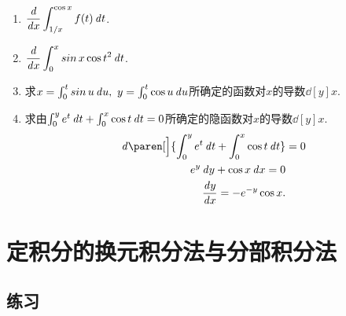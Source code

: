 \documentclass[a4paper,punct=CCT]{ctexbook}
\theoremstyle{definition}
\theoremstyle{remark}
\newif\ifshowsol
\newif\ifshowex
\begin{document}
\begin{enumerate}
\item \(\displaystyle \frac{\mathop{}\!\mathit{d}}{\mathop{}\!\mathit{d} x} \int_{1/x}^{\cos x} f(t) \mathop{}\!\mathit{d} t\).

  \ifshowsol
  \[
    \ddx \int_{1/x}^{\cos x} f(t) \dt
    = \ddx \paren[\Big]{\int_{1/x}^0 f(t) \dt + \int_0^{\cos x} f(t) \dt}
    = \frac{f(1/x)}{x^2} - f(\cos x) \sin x .
  \]
  \fi

\item \(\displaystyle \frac{\mathop{}\!\mathit{d}}{\mathop{}\!\mathit{d} x} \int_0^x \operatorname{\smash{sin}} x \cos t^2 \mathop{}\!\mathit{d} t\).

  \ifshowsol
  \[
    \ddx \int_0^x \sin x \cos t^2 \dt
    = \ddx \sin x \int_0^x \cos t^2 \dt
    = \cos x \int_0^x \cos t^2 \dt + \sin x \cos x^2.
  \]
  \fi

\item 求\(x = \int_0^t \operatorname{\smash{sin}} u \mathop{}\!\mathit{d} u,\ y = \int_0^t \cos u \mathop{}\!\mathit{d} u\)所确定的函数对\(x\)的导数\(\dd[y]x\).

  \ifshowsol
  \[
    \dd[y]x = \frac{\dy/\!\dt}{\dx/\!\dt}
    = \frac{\cos t}{\sin t}
    = \cot t.
  \]
  \fi

\item 求由\(\int_0^y e^t \mathop{}\!\mathit{d} t + \int_0^x \cos t \mathop{}\!\mathit{d} t = 0\)所确定的隐函数对\(x\)的导数\(\dd[y]x\).
  \[
    \begin{split}
      \diff\paren[\Big]{\int_0^y e^t \dt + \int_0^x \cos t \dt}
      &= 0 \\
      e^y \dy + \cos x \dx = 0 \\
      \dd[y]x = - e^{-y} \cos x.
    \end{split}
  \]
\end{enumerate}
\fi

\section{定积分的换元积分法与分部积分法}

\ifshowex
{}
\subsection*{练习}
\end{document}
